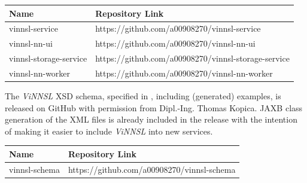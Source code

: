 \begin{longtable}[]{@{}ll@{}}
\toprule
\begin{minipage}[b]{0.29\columnwidth}\raggedright\strut
Name\strut
\end{minipage} & \begin{minipage}[b]{0.65\columnwidth}\raggedright\strut
Repository Link\strut
\end{minipage}\tabularnewline
\midrule
\endhead
\begin{minipage}[t]{0.29\columnwidth}\raggedright\strut
vinnsl-service\strut
\end{minipage} & \begin{minipage}[t]{0.65\columnwidth}\raggedright\strut
https://github.com/a00908270/vinnsl-service\strut
\end{minipage}\tabularnewline
\begin{minipage}[t]{0.29\columnwidth}\raggedright\strut
vinnsl-nn-ui\strut
\end{minipage} & \begin{minipage}[t]{0.65\columnwidth}\raggedright\strut
https://github.com/a00908270/vinnsl-nn-ui\strut
\end{minipage}\tabularnewline
\begin{minipage}[t]{0.29\columnwidth}\raggedright\strut
vinnsl-storage-service\strut
\end{minipage} & \begin{minipage}[t]{0.65\columnwidth}\raggedright\strut
https://github.com/a00908270/vinnsl-storage-service\strut
\end{minipage}\tabularnewline
\begin{minipage}[t]{0.29\columnwidth}\raggedright\strut
vinnsl-nn-worker\strut
\end{minipage} & \begin{minipage}[t]{0.65\columnwidth}\raggedright\strut
https://github.com/a00908270/vinnsl-nn-worker\strut
\end{minipage}\tabularnewline
\bottomrule
\end{longtable}

The \emph{ViNNSL} XSD schema, specified in \cite{kopica_2015}, including
(generated) examples, is released on GitHub with permission from
Dipl.-Ing. Thomas Kopica. JAXB class generation of the XML files is
already included in the release with the intention of making it easier
to include \emph{ViNNSL} into new services.

\begin{longtable}[]{@{}ll@{}}
\toprule
Name & Repository Link\tabularnewline
\midrule
\endhead
vinnsl-schema &
https://github.com/a00908270/vinnsl-schema\tabularnewline
\bottomrule
\end{longtable}

